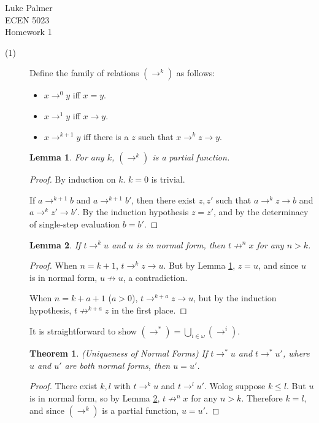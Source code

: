 \documentclass[12pt]{article}
\newtheorem{lemma}{Lemma}
\newtheorem*{theorem*}{Theorem}
\newcommand{\arr}[0]{\rightarrow}
\begin{document}
\noindent Luke Palmer \\
ECEN 5023 \\
Homework 1

\begin{description}
\item[(1)]
 Define the family of relations $(\arr^k)$ as follows:

 \begin{itemize}
  \item $x \arr^0 y$ iff $x = y$.
  \item $x \arr^1 y$ iff $x \arr y$.
  \item $x \arr^{k+1} y$ iff there is a $z$ such that $x \arr^k z \arr y$.
 \end{itemize}
   
 \begin{lemma}
  \label{lemma-partialfunction}
  For any $k$, $(\arr^k)$ is a partial function.
 \end{lemma}
  \begin{proof}
   By induction on $k$.  $k = 0$ is trivial. 

   If $a \arr^{k+1} b$ and $a \arr^{k+1} b'$, then there exist $z,z'$
   such that $a \arr^k z \arr b$ and $a \arr^k z' \arr b'$.  By the
   induction hypothesis $z = z'$, and by the determinacy of single-step
   evaluation $b = b'$.
  \end{proof}
 
 \begin{lemma}
  \label{lemma-normalform}
  If $t \arr^k u$ and $u$ is in normal form, then $t \not\arr^n x$ for
  any $n > k$.
 \end{lemma}
  \begin{proof}
   When $n = k+1$, $t \arr^k z \arr u$.  But by Lemma
   \ref{lemma-partialfunction}, $z = u$, and since $u$ is in normal
   form, $u \not\arr u$, a contradiction.

   When $n = k+a+1$ ($a>0$), $t \arr^{k+a} z \arr u$, but by the induction
   hypothesis, $t \not\arr^{k+a} z$ in the first place.
  \end{proof}

 It is straightforward to show $(\arr^*) = \bigcup\limits_{i\in\omega}{(\arr^i)}$.  

 \begin{theorem*}
  (Uniqueness of Normal Forms) If $t \arr^* u$ and $t \arr^*
  u'$, where $u$ and $u'$ are both normal forms, then $u = u'$.
 \end{theorem*}
  \begin{proof}
   There exist $k,l$ with $t \arr^k u$ and $t \arr^l u'$.  Wolog suppose
   $k \le l$.  But $u$ is in normal form, so by Lemma
   \ref{lemma-normalform}, $t \not\arr^n x$ for any $n > k$.  Therefore
   $k = l$, and since $(\arr^k)$ is a partial function, $u = u'$.
  \end{proof}


\end{description}
\end{document}
